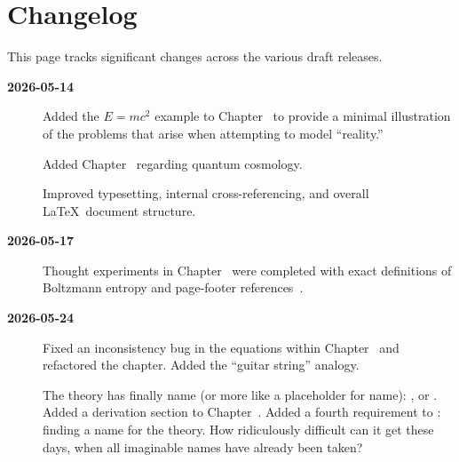 \section*{Changelog}

This page tracks significant changes across the various draft releases.

\begin{description}

\item[\textbf{2026-05-14}]
  Added the $E=mc^2$ example to Chapter~ to provide a
  minimal illustration of the problems that arise when attempting to model
  ``reality.''
  
  Added Chapter~ regarding quantum cosmology.
  
  Improved typesetting, internal cross-referencing, and overall
  \LaTeX\ document structure.
  
\item[\textbf{2026-05-17}]
  Thought experiments in Chapter~ 
  were completed with exact definitions of Boltzmann entropy and page-footer references~\cite{page1983clock}.

\item[\textbf{2026-05-24}]
  Fixed an inconsistency bug in the equations within Chapter~ and refactored
  the chapter. Added the ``guitar string'' analogy.

  The theory has finally name (or more like a placeholder for name): \iame, or \iameverything.
  Added a derivation section to Chapter~.
  Added a fourth requirement to : finding a name for the theory. How
  ridiculously difficult can it get these days, when all imaginable names have already been taken?
\end{description}

\newpage
